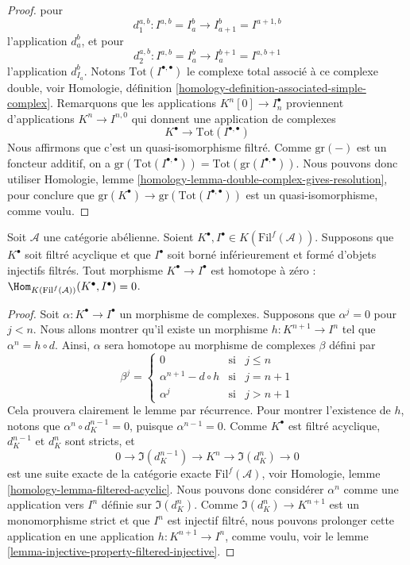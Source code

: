 \begin{proof}
pour
$$
d_1^{a, b} : I^{a, b} = I_a^b \to I_{a + 1}^b = I^{a + 1, b}
$$
l'application $d_a^b$, et pour
$$
d_2^{a, b} : I^{a, b} = I_a^b \to I_a^{b + 1} = I^{a, b + 1}
$$
l'application $d_{I_a}^b$. Notons
$\text{Tot}(I^{\bullet, \bullet})$ le complexe total associé à ce complexe
double, voir Homologie, définition
\ref{homology-definition-associated-simple-complex}.
Remarquons que les applications $K^n[0] \to I_n^\bullet$ proviennent
d'applications $K^n \to I^{n, 0}$ qui donnent une application de complexes
$$
K^\bullet \longrightarrow \text{Tot}(I^{\bullet, \bullet})
$$
Nous affirmons que c'est un quasi-isomorphisme filtré.
Comme $\text{gr}(-)$ est un foncteur additif, on a
$\text{gr}(\text{Tot}(I^{\bullet, \bullet})) =
\text{Tot}(\text{gr}(I^{\bullet, \bullet}))$.
Nous pouvons donc utiliser Homologie, lemme
\ref{homology-lemma-double-complex-gives-resolution}, pour conclure que
$\text{gr}(K^\bullet) \to \text{gr}(\text{Tot}(I^{\bullet, \bullet}))$ est un
quasi-isomorphisme, comme voulu.
\end{proof}









\begin{lemma}
\label{lemma-filtered-acyclic-is-zero}
Soit $\mathcal{A}$ une catégorie abélienne.
Soient $K^\bullet, I^\bullet \in K(\text{Fil}^f(\mathcal{A}))$.
Supposons que $K^\bullet$ soit filtré acyclique et que $I^\bullet$ soit borné
inférieurement et formé d'objets injectifs filtrés.
Tout morphisme $K^\bullet \to I^\bullet$ est homotope à zéro :
$\Hom_{K(\text{Fil}^f(\mathcal{A}))}(K^\bullet, I^\bullet) = 0$.
\end{lemma}

\begin{proof}
Soit $\alpha : K^\bullet \to I^\bullet$ un morphisme de complexes.
Supposons que $\alpha^j = 0$ pour $j < n$.
Nous allons montrer qu'il existe un morphisme $h : K^{n + 1} \to I^n$ tel
que $\alpha^n = h \circ d$. Ainsi, $\alpha$ sera homotope au morphisme de
complexes $\beta$ défini par
$$
\beta^j =
\left\{
\begin{matrix}
0 & \text{si} & j \leq n \\
\alpha^{n + 1} - d \circ h & \text{si} & j = n + 1 \\
\alpha^j & \text{si} & j > n + 1
\end{matrix}
\right.
$$
Cela prouvera clairement le lemme par récurrence.
Pour montrer l'existence de $h$, notons que
$\alpha^n \circ d_K^{n - 1} = 0$, puisque $\alpha^{n - 1} = 0$.
Comme $K^\bullet$ est filtré acyclique, $d_K^{n - 1}$ et $d_K^n$ sont
stricts, et
$$
0 \to \Im(d_K^{n - 1}) \to K^n \to \Im(d_K^n) \to 0
$$
est une suite exacte de la catégorie exacte
$\text{Fil}^f(\mathcal{A})$, voir Homologie, lemme
\ref{homology-lemma-filtered-acyclic}.
Nous pouvons donc considérer $\alpha^n$ comme une application vers $I^n$
définie sur $\Im(d_K^n)$.
Comme $\Im(d_K^n) \to K^{n + 1}$ est un monomorphisme strict et que $I^n$ est
injectif filtré, nous pouvons prolonger cette application en une application
$h : K^{n + 1} \to I^n$, comme voulu, voir le
lemme \ref{lemma-injective-property-filtered-injective}.
\end{proof}

